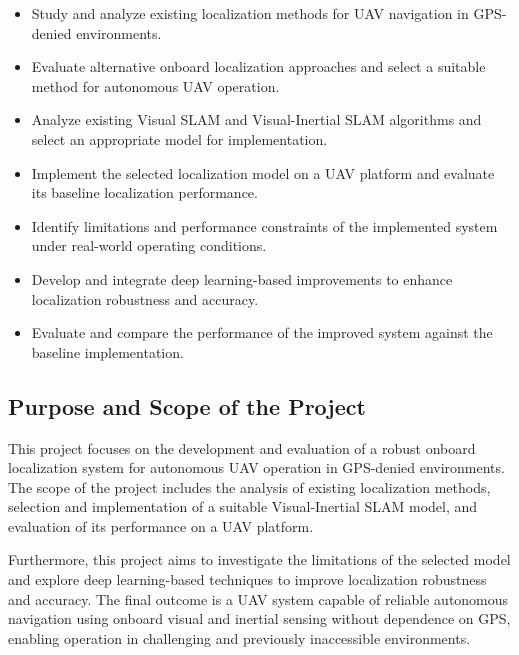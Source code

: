 \begin{itemize}

\item Study and analyze existing localization methods for UAV navigation in GPS-denied environments.

\item Evaluate alternative onboard localization approaches and select a suitable method for autonomous UAV operation.

\item Analyze existing Visual SLAM and Visual-Inertial SLAM algorithms and select an appropriate model for implementation.

\item Implement the selected localization model on a UAV platform and evaluate its baseline localization performance.

\item Identify limitations and performance constraints of the implemented system under real-world operating conditions.

\item Develop and integrate deep learning-based improvements to enhance localization robustness and accuracy.

\item Evaluate and compare the performance of the improved system against the baseline implementation.

\end{itemize}

\subsection{Purpose and Scope of the Project}

This project focuses on the development and evaluation of a robust onboard localization system for autonomous UAV operation in GPS-denied environments. The scope of the project includes the analysis of existing localization methods, selection and implementation of a suitable Visual-Inertial SLAM model, and evaluation of its performance on a UAV platform.

Furthermore, this project aims to investigate the limitations of the selected model and explore deep learning-based techniques to improve localization robustness and accuracy. The final outcome is a UAV system capable of reliable autonomous navigation using onboard visual and inertial sensing without dependence on GPS, enabling operation in challenging and previously inaccessible environments.